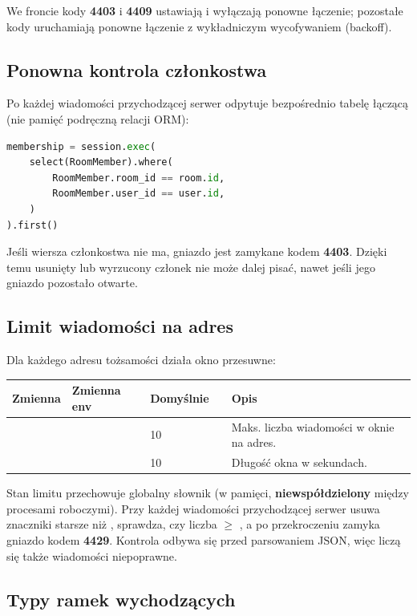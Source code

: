We froncie kody \textbf{4403} i \textbf{4409} ustawiają  i wyłączają ponowne łączenie;
pozostałe kody uruchamiają ponowne łączenie z wykładniczym wycofywaniem (backoff).

\subsection{Ponowna kontrola członkostwa}

Po każdej wiadomości przychodzącej serwer odpytuje bezpośrednio tabelę łączącą 
(nie pamięć podręczną relacji ORM):

\begin{lstlisting}[language=Python]
membership = session.exec(
    select(RoomMember).where(
        RoomMember.room_id == room.id,
        RoomMember.user_id == user.id,
    )
).first()
\end{lstlisting}

Jeśli wiersza członkostwa nie ma, gniazdo jest zamykane kodem \textbf{4403}. Dzięki temu
usunięty lub wyrzucony członek nie może dalej pisać, nawet jeśli jego gniazdo pozostało otwarte.

\subsection{Limit wiadomości na adres}

Dla każdego adresu tożsamości działa okno przesuwne:

\begin{tabularx}{\textwidth}{llllY}
\toprule
Zmienna & Zmienna env & Domyślnie & & Opis \\
\midrule
{} &  & 10 & & Maks. liczba wiadomości w oknie na adres. \\
 &  & 10 & & Długość okna w sekundach. \\
\bottomrule
\end{tabularx}

Stan limitu przechowuje globalny słownik  (w pamięci,
\textbf{niewspółdzielony} między procesami roboczymi). Przy każdej wiadomości przychodzącej serwer
usuwa znaczniki starsze niż , sprawdza, czy liczba $\geq$ , a po
przekroczeniu zamyka gniazdo kodem \textbf{4429}. Kontrola odbywa się przed parsowaniem JSON, więc
liczą się także wiadomości niepoprawne.

\subsection{Typy ramek wychodzących}
\label{sec:rt-ramki-wychodzace}

